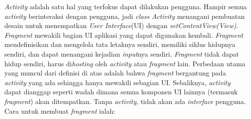 \emph{Activity} adalah satu hal yang terfokus dapat dilakukan pengguna. Hampir semua \textit{activity} berinteraksi dengan pengguna, jadi \textit{class Activity} menangani pembuatan desain untuk menempatkan \textit{User Interface}(UI) dengan \textit{setContentView(View)}.
\textit{Fragment} mewakili bagian UI aplikasi yang dapat digunakan kembali. \textit{Fragment} mendefinisikan dan mengelola tata letaknya sendiri, memiliki siklus hidupnya sendiri, dan dapat menangani kejadian \textit{input}nya sendiri. \textit{Fragment} tidak dapat hidup sendiri, harus di\textit{hosting} oleh \textit{activity} atau \textit{fragment} lain.
Perbedaan utama yang muncul dari definisi di atas adalah bahwa \textit{fragment} bergantung pada \textit{activity} yang ada sehingga hanya mewakili sebagian UI. Sebaliknya, \textit{activity} dapat dianggap seperti wadah dimana semua komponen UI lainnya (termasuk \textit{fragment}) akan ditempatkan. Tanpa \textit{activity}, tidak akan ada \textit{interface} pengguna. Cara untuk membuat \textit{fragment} ialah:
